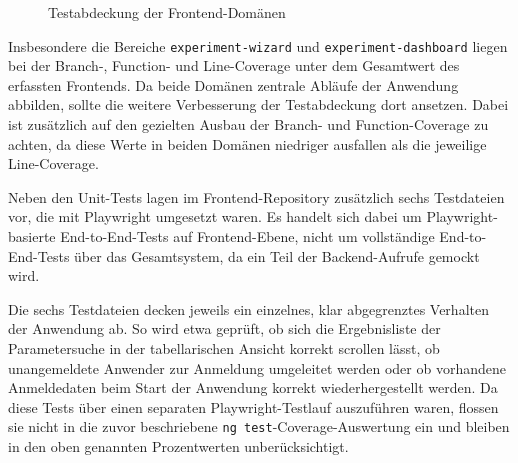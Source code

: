 \begin{figure}[H]
\centering
{}
\caption{Testabdeckung der Frontend-Domänen}
\label{fig:frontend-coverage-domaenen}
\end{figure}

Insbesondere die Bereiche \texttt{experiment-wizard} und \texttt{experiment-dashboard} liegen bei der Branch-, Function- und Line-Coverage unter dem Gesamtwert des erfassten Frontends. Da beide Domänen zentrale Abläufe der Anwendung abbilden, sollte die weitere Verbesserung der Testabdeckung dort ansetzen. Dabei ist zusätzlich auf den gezielten Ausbau der Branch- und Function-Coverage zu achten, da diese Werte in beiden Domänen niedriger ausfallen als die jeweilige Line-Coverage.

Neben den Unit-Tests lagen im Frontend-Repository zusätzlich sechs Testdateien vor, die mit Playwright umgesetzt waren. Es handelt sich dabei um Playwright-basierte End-to-End-Tests auf Frontend-Ebene, nicht um vollständige End-to-End-Tests über das Gesamtsystem, da ein Teil der Backend-Aufrufe gemockt wird.

Die sechs Testdateien decken jeweils ein einzelnes, klar abgegrenztes Verhalten der Anwendung ab. So wird etwa geprüft, ob sich die Ergebnisliste der Parametersuche in der tabellarischen Ansicht korrekt scrollen lässt, ob unangemeldete Anwender zur Anmeldung umgeleitet werden oder ob vorhandene Anmeldedaten beim Start der Anwendung korrekt wiederhergestellt werden. Da diese Tests über einen separaten Playwright-Testlauf auszuführen waren, flossen sie nicht in die zuvor beschriebene \texttt{ng test}-Coverage-Auswertung ein und bleiben in den oben genannten Prozentwerten unberücksichtigt.

